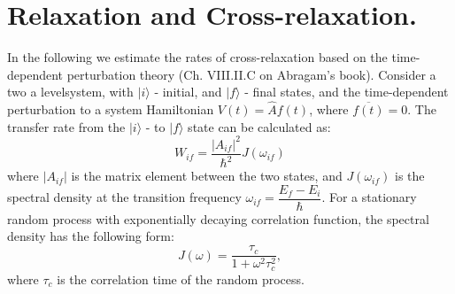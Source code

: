 \documentclass[a4paper, 12pt]{article}
\begin{document}
\section{Relaxation and Cross-relaxation.}
In the following we estimate the rates of cross-relaxation based on the time-dependent perturbation theory (Ch. VIII.II.C on Abragam's book). Consider a two a levelsystem, with $\vert i \rangle$ - initial, and $\vert f \rangle$ - final states, and the time-dependent perturbation to a system Hamiltonian $V(t) = \hat{A} f(t)$, where $\overline{f(t)} = 0$. The transfer rate from the $\vert i \rangle$ - to  $\vert f \rangle$ state can be calculated as:
\begin{equation} \label{eq:rate}
 W_{if} = \dfrac{ \vert A_{if} \vert ^2  }{\hbar^2} J(\omega_{if}) 
\end{equation}
where $\vert A_{if} \vert$ is the matrix element between the two states, and $J({\omega_{if}})$ is the spectral density at the transition frequency $\omega_{if} = \dfrac{E_f - E_i}{\hbar}$. For a stationary random process with exponentially decaying correlation function, the spectral density has the following form:
\begin{equation}
J(\omega) = \dfrac{\tau_c}{1+\omega^2\tau_c^2}, 
\end{equation} 
where $\tau_c$ is the correlation time of the random process.
\end{document}

